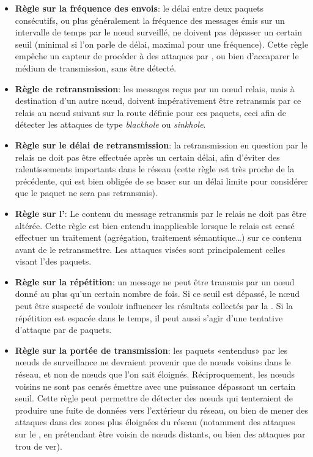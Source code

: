 \begin{itemize}
    \item \textbf{Règle sur la fréquence des envois}: le délai entre deux paquets consécutifs, ou plus généralement la fréquence des messages émis sur un intervalle de temps par le nœud surveillé, ne doivent pas dépasser un certain seuil (minimal si l'on parle de délai, maximal pour une fréquence). Cette règle empêche un capteur de procéder à des attaques par \deluge, ou bien d'accaparer le médium de transmission, sans être détecté.
    \item \textbf{Règle de retransmission}: les messages reçus par un nœud relais, mais à destination d'un autre nœud, doivent impérativement être retransmis par ce relais au nœud suivant sur la route définie pour ces paquets, ceci afin de détecter les attaques de type \textit{blackhole} ou \textit{sinkhole}.
    \item \textbf{Règle sur le délai de retransmission}: la retransmission en question par le relais ne doit pas être effectuée après un certain délai, afin d'éviter des ralentissements importants dans le réseau (cette règle est très proche de la précédente, qui est bien obligée de se baser sur un délai limite pour considérer que le paquet ne sera pas retransmis).
    \item \textbf{Règle sur l'\integrite}: Le contenu du message retransmis par le relais ne doit pas être altérée. Cette règle est bien entendu inapplicable lorsque le relais est censé effectuer un traitement (agrégation, traitement sémantique\dots) sur ce contenu avant de le retransmettre. Les attaques visées sont principalement celles visant l'\integrite des paquets.
    \item \textbf{Règle sur la répétition}: un message ne peut être transmis par un nœud donné au plus qu'un certain nombre de fois. Si ce seuil est dépassé, le nœud peut être suspecté de vouloir influencer les résultats collectés par la \sdb. Si la répétition est espacée dans le temps, il peut aussi s'agir d'une tentative d'attaque par  de paquets.
    \item \textbf{Règle sur la portée de transmission}: les paquets «entendus» par les nœuds de surveillance ne devraient provenir que de nœuds voisins dans le réseau, et non de nœuds que l'on sait éloignés. Réciproquement, les nœuds voisins ne sont pas censés émettre avec une puissance dépassant un certain seuil. Cette règle peut permettre de détecter des nœuds qui tenteraient de produire une fuite de données vers l'extérieur du réseau, ou bien de mener des attaques dans des zones plus éloignées du réseau (notamment des attaques sur le , en prétendant être voisin de nœuds distants, ou bien des attaques par trou de ver).

\end{itemize}
